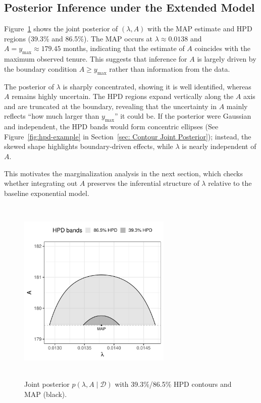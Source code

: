 \subsection{Posterior Inference under the Extended Model}
\label{res:post_contour}
Figure~\ref{fig:contour} shows the joint posterior of $(\lambda, A)$ with the MAP estimate and HPD regions (39.3\% and 86.5\%). The MAP occurs at $\lambda \approx 0.0138$ and $A = y_{\max} \approx 179.45$ months, indicating that the estimate of $A$ coincides with the maximum observed tenure. This suggests that inference for $A$ is largely driven by the boundary condition $A \geq y_{\max}$ rather than information from the data.

The posterior of $\lambda$ is sharply concentrated, showing it is well identified, whereas $A$ remains highly uncertain. The HPD regions expand vertically along the $A$ axis and are truncated at the boundary, revealing that the uncertainty in $A$ mainly reflects “how much larger than $y_{\max}$” it could be. If the posterior were Gaussian and independent, the HPD bands would form concentric ellipses (See Figure~\ref{fig:hpd-example} in Section~\ref{sec: Contour Joint Posterior}); instead, the skewed shape highlights boundary-driven effects, while $\lambda$ is nearly independent of $A$.

This motivates the marginalization analysis in the next section, which checks whether integrating out $A$ preserves the inferential structure of $\lambda$ relative to the baseline exponential model.
\begin{figure}[H]
    \centering
    \includegraphics[height=9cm, width=0.65\textwidth]{images/post_contour.pdf}
    \caption{{\small Joint posterior $p(\lambda,A\mid\mathcal D)$ with 39.3\%/86.5\% HPD contours and MAP (black).}}
    \label{fig:contour}
\end{figure}


